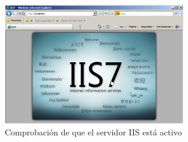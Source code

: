 \documentclass[10pt,a4paper,spanish]{article}
\numberwithin{equation}{section} %
\numberwithin{figure}{section} %
\numberwithin{table}{section} %
\begin{document}
\begin{figure}
    \centering
    \includegraphics[width=0.7\textwidth]{21}
    \caption{Comprobación de que el servidor IIS está activo}
    \label{iisok}
\end{figure}
\end{document}
